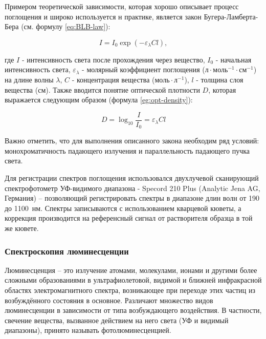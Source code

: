 \documentclass[a4paper, 12pt]{article}
\begin{document}
\begin{onehalfspace}
		Примером теоретической зависимости, которая хорошо описывает процесс поглощения и широко используется н практике, является закон Бугера-Ламберта-Бера (см. формулу \ref{eq:BLB-law}):

		\begin{equation}
			I=I_0\exp(-\varepsilon_\lambda Cl),
			\label{eq:BLB-law}
		\end{equation}

		где $I$ - интенсивность света после прохождения через вещество, $I_0$ - начальная интенсивность света, $\varepsilon_\lambda$ - молярный коэффициент поглощения ($\text{л}\cdot\text{моль}^{-1}\cdot\text{см}^{-1}$) на длине волны $\lambda$, $C$ - концентрация вещества ($\text{моль}\cdot\text{л}^{-1}$), $l$ - толщина слоя вещества ($\text{см}$). Также вводится понятие оптической плотности $D$, которая выражается следующим образом (формула \ref{eg:opt-density}):

		\begin{equation}
			D=\log_{10}\frac I {I_0} = \varepsilon_\lambda Cl
			\label{eg:opt-density}
		\end{equation}

		Важно отметить, что для выполнения описанного закона необходим ряд условий: монохроматичность падающего излучения и параллельность падающего пучка света.

		Для регистрации спектров поглощения использовался двухлучевой сканирующий спектрофотометр УФ-видимого диапазона - Specord 210 Plus (Analytic Jena AG, Германия) – позволяющий регистрировать спектры в диапазоне длин волн от 190 до 1100~нм. Спектры записываются с использованием кварцевой кюветы, а коррекция производится на референсный сигнал от растворителя образца в той же кювете.

		\subsubsection*{Спектроскопия люминесценции}

		Люминесценция – это излучение атомами, молекулами, ионами и другими более сложными образованиями в ультрафиолетовой, видимой и ближней инфракрасной областях электромагнитного спектра, возникающее при переходе этих частиц из возбуждённого состояния в основное.
		Различают множество видов люминесценции в зависимости от типа возбуждающего воздействия.
		В частности, свечение вещества, вызванное действием на него света (УФ и видимый диапазоны), принято называть фотолюминесценцией.


\end{onehalfspace}
\end{document}
